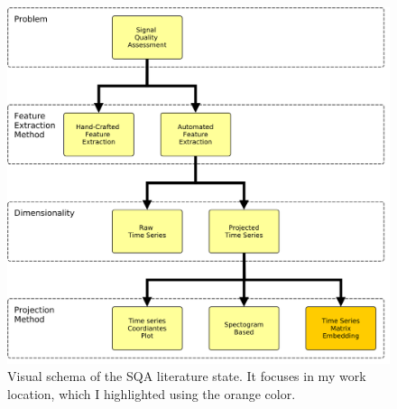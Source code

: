 \begin{figure}[t]
	\centering
	\includegraphics[width=\SubjectTreeSize]{img/SubjectTree.png}
	\caption{Visual schema of the \acrshort{SQA} literature state. It focuses in my work location, which I highlighted using the orange color.}
	\label{fig:SubjectTree}
\end{figure}
